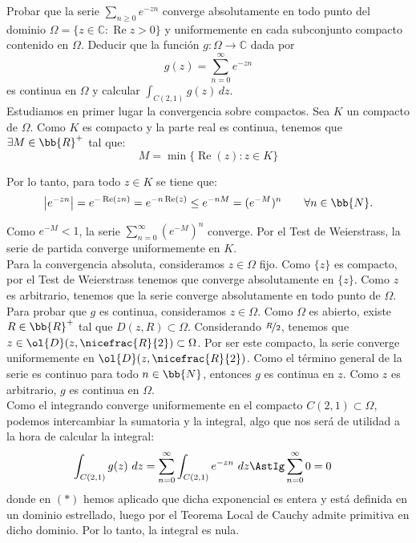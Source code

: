 \documentclass[12pt]{article}
\renewcommand{\Re}{\operatorname{Re}} %
\begin{document}
    \newpage
    \setcounter{ejercicio}{0}


    \begin{ejercicio}[3.5 puntos]
        Probar que la serie $\sum\limits_{n \geq 0} e^{-zn}$ converge absolutamente en todo punto del dominio $\Omega = \{z \in \mathbb{C} : \Re z > 0\}$ y uniformemente en cada subconjunto compacto contenido en $\Omega$. Deducir que la función $g : \Omega \to \mathbb{C}$ dada por
        \[
            g(z) = \sum\limits_{n=0}^{\infty} e^{-zn}
        \]
        es continua en $\Omega$ y calcular $\displaystyle \int_{C(2,1)} g(z) \, dz$.\\

        Estudiamos en primer lugar la convergencia sobre compactos. Sea $K$ un compacto de $\Omega$. Como $K$ es compacto y la parte real es continua, tenemos que $\exists M\in \bb{R}^+$ tal que:
        \begin{equation*}
            M=\min\{\Re(z) : z \in K\}
        \end{equation*}
        
        Por lo tanto, para todo $z \in K$ se tiene que:
        \begin{equation*}
            \left|e^{-zn}\right| = e^{-\Re(zn)} = e^{-n\Re(z)} \leq e^{-nM} = (e^{-M})^n \qquad \forall n \in \bb{N}.
        \end{equation*}

        Como $e^{-M} < 1$, la serie $\sum\limits_{n=0}^{\infty} (e^{-M})^n$ converge. Por el Test de Weierstrass, la serie de partida converge uniformemente en $K$.\\

        Para la convergencia absoluta, consideramos $z\in \Omega$ fijo. Como $\{z\}$ es compacto, por el Test de Weierstrass tenemos que converge absolutamente en $\{z\}$. Como $z$ es arbitrario, tenemos que la serie converge absolutamente en todo punto de $\Omega$.\\

        Para probar que $g$ es continua, consideramos $z\in \Omega$. Como $\Omega$ es abierto, existe $R\in \bb{R}^+$ tal que $D(z,R)\subset \Omega$. Considerando $\nicefrac{R}{2}$, tenemos que $z\in \ol{D}(z,\nicefrac{R}{2})\subset \Omega$. Por ser este compacto, la serie converge uniformemente en $\ol{D}(z,\nicefrac{R}{2})$. Como el término general de la serie es continuo para todo $n\in \bb{N}$, entonces $g$ es continua en $z$. Como $z$ es arbitrario, $g$ es continua en $\Omega$.\\

        Como el integrando converge uniformemente en el compacto $C(2,1)\subset \Omega$, podemos intercambiar la sumatoria y la integral, algo que nos será de utilidad a la hora de calcular la integral:
        \begin{align*}
            \int_{C(2,1)} g(z)\ dz &= \sum_{n=0}^{\infty} \int_{C(2,1)} e^{-zn}\ dz \AstIg \sum_{n=0}^{\infty} 0 = 0
        \end{align*}
        donde en $(\ast)$ hemos aplicado que dicha exponencial es entera y está definida en un dominio estrellado, luego por el Teorema Local de Cauchy admite primitiva en dicho dominio. Por lo tanto, la integral es nula.
    \end{ejercicio}
\end{document}
